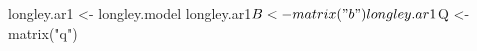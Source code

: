\begin{Schunk}
\begin{Sinput}
 longley.ar1 <- longley.model
 longley.ar1$B <- matrix("b")
 longley.ar1$Q <- matrix("q")
\end{Sinput}
\end{Schunk}
